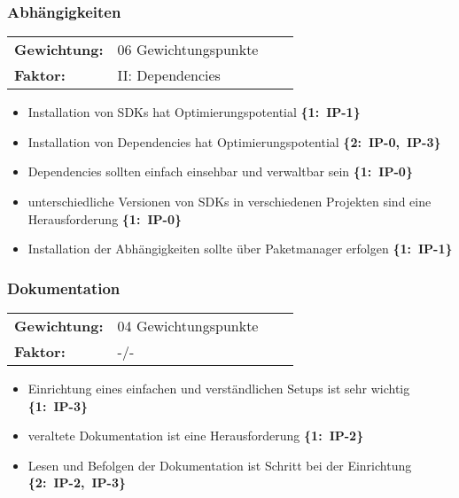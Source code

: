 \subsubsection{Abhängigkeiten}
\label{subsubsec:AA-04-01-04_req-dev-dependencies}

\vspace{0.5em}
\begin{tabular}{ll@{}ll@{}}
    \textbf{Gewichtung:}    &   06 Gewichtungspunkte    \\
    \textbf{Faktor:}        &   II: Dependencies        \\
\end{tabular}

\begin{flushleft}
    \begin{itemize}
        \item Installation von SDKs hat Optimierungspotential \mbox{\textbf{\{1: IP-1\}}}
        \item Installation von Dependencies hat Optimierungspotential \mbox{\textbf{\{2: IP-0, IP-3\}}}
        \item Dependencies sollten einfach einsehbar und verwaltbar sein \mbox{\textbf{\{1: IP-0\}}}
        \item unterschiedliche Versionen von SDKs \linebreak[1] in verschiedenen Projekten sind eine Herausforderung \mbox{\textbf{\{1: IP-0\}}}
        \item Installation der Abhängigkeiten sollte über Paketmanager erfolgen \mbox{\textbf{\{1: IP-1\}}}
    \end{itemize}
\end{flushleft}

\subsubsection{Dokumentation}
\label{subsubsec:AA-04-01-05_req-dev-documentation}

\vspace{0.5em}
\begin{tabular}{ll@{}ll@{}}
    \textbf{Gewichtung:}    &   04 Gewichtungspunkte    \\
    \textbf{Faktor:}        &   -/-                     \\
\end{tabular}

\begin{flushleft}
    \begin{itemize}
        \item Einrichtung eines einfachen und verständlichen Setups ist sehr wichtig \mbox{\textbf{\{1: IP-3\}}}
        \item veraltete Dokumentation ist eine Herausforderung \mbox{\textbf{\{1: IP-2\}}}
        \item Lesen und Befolgen der Dokumentation ist Schritt bei der Einrichtung \mbox{\textbf{\{2: IP-2, IP-3\}}}
    \end{itemize}
\end{flushleft}

